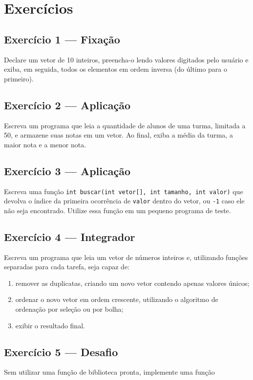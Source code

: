 \documentclass[12pt,a4paper,oneside]{extreport}
\begin{document}
\section*{Exercícios}

\begin{exercicio}

\subsection*{Exercício 1 --- Fixação}
Declare um vetor de 10 inteiros, preencha-o lendo valores digitados pelo usuário e exiba, em seguida, todos os elementos em ordem inversa (do último para o primeiro).

\subsection*{Exercício 2 --- Aplicação}
Escreva um programa que leia a quantidade de alunos de uma turma, limitada a 50, e armazene suas notas em um vetor. Ao final, exiba a média da turma, a maior nota e a menor nota.

\subsection*{Exercício 3 --- Aplicação}
Escreva uma função \texttt{int buscar(int vetor[], int tamanho, int valor)} que devolva o índice da primeira ocorrência de \texttt{valor} dentro do vetor, ou \texttt{-1} caso ele não seja encontrado. Utilize essa função em um pequeno programa de teste.

\subsection*{Exercício 4 --- Integrador}
Escreva um programa que leia um vetor de números inteiros e, utilizando funções separadas para cada tarefa, seja capaz de:

\begin{enumerate}
\item remover as duplicatas, criando um novo vetor contendo apenas valores únicos;
\item ordenar o novo vetor em ordem crescente, utilizando o algoritmo de ordenação por seleção ou por bolha;
\item exibir o resultado final.
\end{enumerate}

\subsection*{Exercício 5 --- Desafio}
Sem utilizar uma função de biblioteca pronta, implemente uma função


\end{exercicio}
\end{document}

